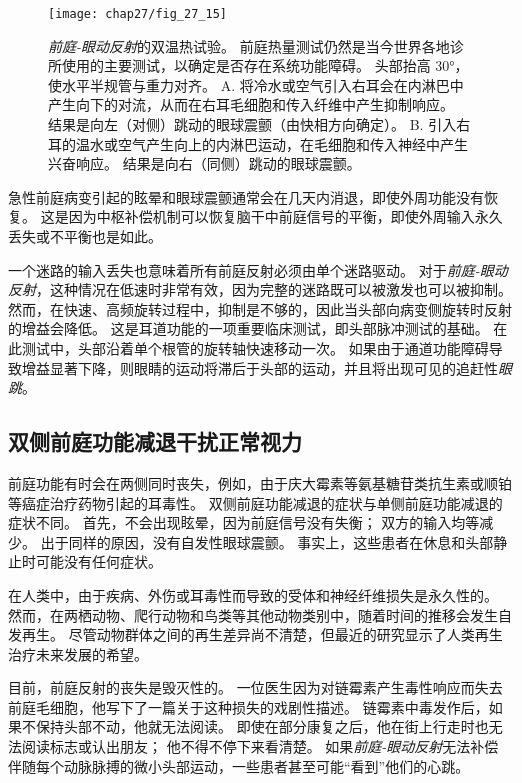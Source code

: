 \begin{figure}[htbp]
	\centering
	\texttt{[image: chap27/fig\_27\_15]}
	\caption{\textit{前庭-眼动反射}的双温热试验。
		前庭热量测试仍然是当今世界各地诊所使用的主要测试，以确定是否存在系统功能障碍。
		头部抬高 30°，使水平半规管与重力对齐。
		A. 将冷水或空气引入右耳会在内淋巴中产生向下的对流，从而在右耳毛细胞和传入纤维中产生抑制响应。
		结果是向左（对侧）跳动的眼球震颤（由快相方向确定）。
		B. 引入右耳的温水或空气产生向上的内淋巴运动，在毛细胞和传入神经中产生兴奋响应。
		结果是向右（同侧）跳动的眼球震颤。}
	\label{fig:27_15}
\end{figure}


急性前庭病变引起的眩晕和眼球震颤通常会在几天内消退，即使外周功能没有恢复。
这是因为中枢补偿机制可以恢复脑干中前庭信号的平衡，即使外周输入永久丢失或不平衡也是如此。


一个迷路的输入丢失也意味着所有前庭反射必须由单个迷路驱动。
对于\textit{前庭-眼动反射}，这种情况在低速时非常有效，因为完整的迷路既可以被激发也可以被抑制。
然而，在快速、高频旋转过程中，抑制是不够的，因此当头部向病变侧旋转时反射的增益会降低。
这是耳道功能的一项重要临床测试，即头部脉冲测试的基础。
在此测试中，头部沿着单个根管的旋转轴快速移动一次。
如果由于通道功能障碍导致增益显著下降，则眼睛的运动将滞后于头部的运动，并且将出现可见的追赶性\textit{眼跳}。



\subsection{双侧前庭功能减退干扰正常视力}

前庭功能有时会在两侧同时丧失，例如，由于庆大霉素等氨基糖苷类抗生素或顺铂等癌症治疗药物引起的耳毒性。
双侧前庭功能减退的症状与单侧前庭功能减退的症状不同。
首先，不会出现眩晕，因为前庭信号没有失衡；
双方的输入均等减少。
出于同样的原因，没有自发性眼球震颤。
事实上，这些患者在休息和头部静止时可能没有任何症状。


在人类中，由于疾病、外伤或耳毒性而导致的受体和神经纤维损失是永久性的。
然而，在两栖动物、爬行动物和鸟类等其他动物类别中，随着时间的推移会发生自发再生。
尽管动物群体之间的再生差异尚不清楚，但最近的研究显示了人类再生治疗未来发展的希望。


目前，前庭反射的丧失是毁灭性的。
一位医生因为对链霉素产生毒性响应而失去前庭毛细胞，他写下了一篇关于这种损失的戏剧性描述。
链霉素中毒发作后，如果不保持头部不动，他就无法阅读。
即使在部分康复之后，他在街上行走时也无法阅读标志或认出朋友；
他不得不停下来看清楚。
如果\textit{前庭-眼动反射}无法补偿伴随每个动脉脉搏的微小头部运动，一些患者甚至可能“看到”他们的心跳。



